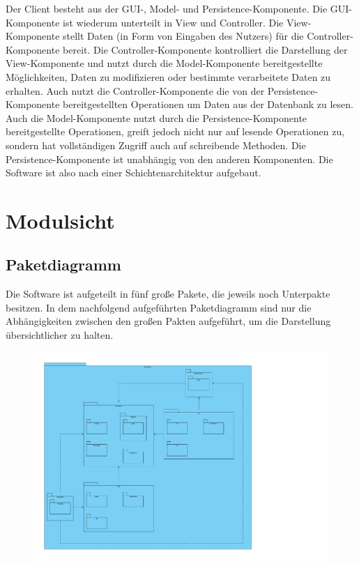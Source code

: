 \documentclass[fontsize=12pt,paper=a4,twoside]{scrartcl}
\begin{document}
Der Client besteht aus der GUI-, Model- und Persistence-Komponente. Die GUI-Komponente ist wiederum unterteilt in View und Controller. Die View-Komponente stellt Daten (in Form von Eingaben des Nutzers) für die Controller-Komponente bereit. Die Controller-Komponente kontrolliert die Darstellung der View-Komponente und nutzt durch die Model-Komponente bereitgestellte Möglichkeiten, Daten zu modifizieren oder bestimmte verarbeitete Daten zu erhalten. Auch nutzt die Controller-Komponente die von der Persistence-Komponente bereitgestellten Operationen um Daten aus der Datenbank zu lesen. Auch die Model-Komponente nutzt durch die Persistence-Komponente bereitgestellte Operationen, greift jedoch nicht nur auf lesende Operationen zu, sondern hat vollständigen Zugriff auch auf schreibende Methoden. Die Persistence-Komponente ist unabhängig von den anderen Komponenten. Die Software ist also nach einer Schichtenarchitektur aufgebaut.

\section{Modulsicht}
\label{sec:modulsicht}

\subsection{Paketdiagramm}
Die Software ist aufgeteilt in fünf große Pakete, die jeweils noch Unterpakte besitzen. In dem nachfolgend aufgeführten Paketdiagramm sind nur die Abhängigkeiten zwischen den großen Pakten aufgeführt, um die Darstellung übersichtlicher zu halten.

\begin{figure}[H]
\centering
\includegraphics[width=\textwidth]{packages.pdf}
\end{figure}
\end{document}
